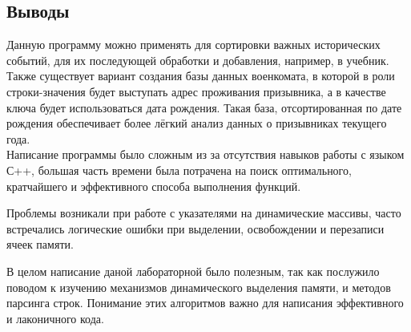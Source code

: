 \documentclass[12pt]{article}
\begin{document}
\subsection*{Выводы}


Данную программу можно применять для сортировки важных исторических событий, для их последующей обработки и добавления, например, в учебник.\\

Также существует вариант создания базы данных военкомата, в которой в роли строки-значения будет выступать адрес проживания призывника, а в качестве ключа будет использоваться дата рождения. Такая база, отсортированная по дате рождения обеспечивает более лёгкий анализ данных о призывниках текущего года.\\


Написание программы было сложным из за отсутствия навыков работы с языком С++, большая часть времени была потрачена на поиск оптимального, кратчайшего и эффективного способа выполнения функций.


Проблемы возникали при работе с указателями на динамические массивы, часто встречались логические ошибки при выделении, освобождении и перезаписи ячеек памяти.


В целом написание даной лабораторной было полезным, так как послужило поводом к изучению механизмов динамического выделения памяти, и методов парсинга строк. Понимание этих алгоритмов важно для написания эффективного и лаконичного кода. 


\end{document}
